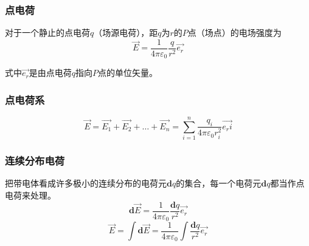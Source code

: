 \subsubsection{点电荷}
对于一个静止的点电荷$q$（场源电荷），距$q$为$r$的$P$点（场点）的电场强度为
$$\vec{E}=\frac{1}{4\pi\varepsilon_0}\frac{q}{r^2}\vec{e_r}$$

式中$\vec{e_r}$是由点电荷$q$指向$P$点的单位矢量。

\subsubsection{点电荷系}
$$\vec{E}=\vec{E_1}+\vec{E_2}+\dots+\vec{E_n}=\sum_{i=1}^n{\frac{q_i}{4\pi\varepsilon_0 r_i^2}\vec{e_ri}}$$

\subsubsection{连续分布电荷}
把带电体看成许多极小的连续分布的电荷元$\mathbf{d}q$的集合，每一个电荷元$\mathbf{d}q$都当作点电荷来处理。
$$\mathbf{d}\vec{E}=\frac{1}{4\pi\varepsilon_0}\frac{\mathbf{d}q}{r^2}\vec{e_r}$$
$$\vec{E}=\int\mathbf{d}\vec{E}=\frac{1}{4\pi\varepsilon_0}\int\frac{\mathbf{d}q}{r^2}\vec{e_r}$$

